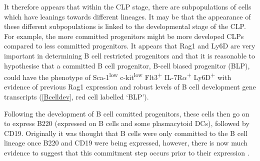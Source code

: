 It therefore appears that within the CLP stage, there are subpopulations of cells which have leanings towards different lineages.
It may be that the appearance of these different subpopulations is linked to the developmental stage of the CLP.
For example, the more committed progenitors might be more developed CLPs compared to less committed progenitors.
It appears that Rag1 and Ly6D are very important in determining B cell restricted progenitors and that it is reasonable to hypothesise that a committed B cell progenitor, B-cell biased progenitor (BLP), could have the phenotype of Sca-1\textsuperscript{low} c-kit\textsuperscript{low} Flt3\textsuperscript{+} IL-7R$\alpha$\textsuperscript{+} Ly6D\textsuperscript{+} with evidence of previous Rag1 expression and robust levels of B cell development gene transcripts (\cref{Bcelldev}, red cell labelled `BLP').

Following the development of B cell comitted progenitors, these cells then go on to express B220 (expressed on B cells and some plasmacytoid DCs), followed by CD19.
Originally it was thought that B cells were only committed to the B cell lineage once B220 and CD19 were being expressed, however, there is now much evidence to suggest that this commitment step occurs prior to their expression \citep{Mansson2008}.

